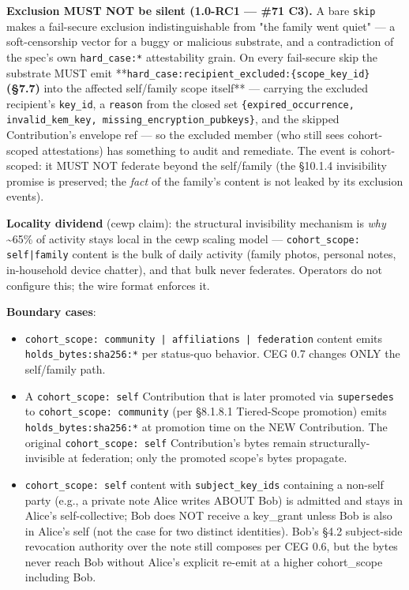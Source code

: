 \documentclass[10pt]{article}
\begin{document}
\textbf{Exclusion MUST NOT be silent (1.0-RC1 — \#71 C3).} A bare \texttt{skip} makes a fail-secure exclusion indistinguishable from "the family went quiet" — a soft-censorship vector for a buggy or malicious substrate, and a contradiction of the spec's own \texttt{hard\_case:*} attestability grain. On every fail-secure skip the substrate MUST emit **\texttt{hard\_case:recipient\_excluded:\{scope\_key\_id\}}\textbf{ (§7.7) }into the affected self/family scope itself** — carrying the excluded recipient's \texttt{key\_id}, a \texttt{reason} from the closed set \texttt{\{expired\_occurrence, invalid\_kem\_key, missing\_encryption\_pubkeys\}}, and the skipped Contribution's envelope ref — so the excluded member (who still sees cohort-scoped attestations) has something to audit and remediate. The event is cohort-scoped: it MUST NOT federate beyond the self/family (the §10.1.4 invisibility promise is preserved; the \textit{fact} of the family's content is not leaked by its exclusion events).


\textbf{Locality dividend} (cewp claim): the structural invisibility mechanism is \textit{why} \textasciitilde{}65\% of activity stays local in the cewp scaling model — \texttt{cohort\_scope: self|family} content is the bulk of daily activity (family photos, personal notes, in-household device chatter), and that bulk never federates. Operators do not configure this; the wire format enforces it.


\textbf{Boundary cases}:


\begin{itemize}\setlength\itemsep{0pt}
\item \texttt{cohort\_scope: community | affiliations | federation} content emits \texttt{holds\_bytes:sha256:*} per status-quo behavior. CEG 0.7 changes ONLY the self/family path.
\item A \texttt{cohort\_scope: self} Contribution that is later promoted via \texttt{supersedes} to \texttt{cohort\_scope: community} (per §8.1.8.1 Tiered-Scope promotion) emits \texttt{holds\_bytes:sha256:*} at promotion time on the NEW Contribution. The original \texttt{cohort\_scope: self} Contribution's bytes remain structurally-invisible at federation; only the promoted scope's bytes propagate.
\item \texttt{cohort\_scope: self} content with \texttt{subject\_key\_ids} containing a non-self party (e.g., a private note Alice writes ABOUT Bob) is admitted and stays in Alice's self-collective; Bob does NOT receive a key\_grant unless Bob is also in Alice's self (not the case for two distinct identities). Bob's §4.2 subject-side revocation authority over the note still composes per CEG 0.6, but the bytes never reach Bob without Alice's explicit re-emit at a higher cohort\_scope including Bob.
\end{itemize}
\end{document}
